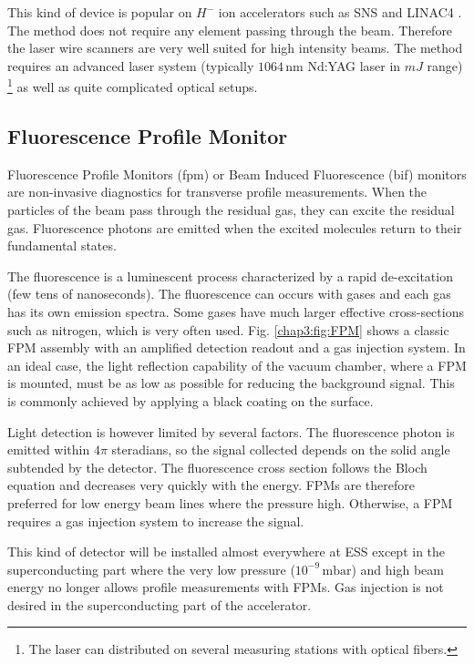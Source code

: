 \begin{refsection}
  This kind of device is popular on $H^-$ ion accelerators such as SNS \cite{LIU2010241} and LINAC4 \cite{Hofmann2015}. The method does not require any element passing through the beam. Therefore the laser wire scanners are very well suited for high intensity beams. The method requires an advanced laser system (typically $1064\,\mathrm{nm}$ Nd:YAG laser in $mJ$ range) \footnote{The laser can distributed on several measuring stations with optical fibers.} as well as quite complicated optical setups.

  \subsection{Fluorescence Profile Monitor}
  Fluorescence Profile Monitors (\acrshort{fpm}) or Beam Induced Fluorescence (\acrshort{bif}) monitors are non-invasive diagnostics for transverse profile measurements. When the particles of the beam pass through the residual gas, they can excite the residual gas. Fluorescence photons are emitted when the excited molecules return to their fundamental states.

  The fluorescence is a luminescent process characterized by a rapid de-excitation (few tens of nanoseconds). The fluorescence can occurs with gases and each gas has its own emission spectra. Some gases have much larger effective cross-sections such as nitrogen, which is very often used. Fig. \ref{chap3:fig:FPM} shows a classic FPM assembly with an amplified detection readout and a gas injection system. In an ideal case, the light reflection capability of the vacuum chamber, where a FPM is mounted, must be as low as possible for reducing the background signal. This is commonly achieved by applying a black coating on the surface.

  
  Light detection is however limited by several factors. The fluorescence photon is emitted within $4\pi$ steradians, so the signal collected depends on the solid angle subtended by the detector. The fluorescence cross section follows the Bloch equation and decreases very quickly with the energy. FPMs are therefore preferred for low energy beam lines where the pressure high. Otherwise, a FPM requires a gas injection system to increase the signal.

  This kind of detector will be installed almost everywhere at ESS \cite{Thomas2016} except in the superconducting part where the very low pressure ($10^{-9}\,\mathrm{mbar}$) and high beam energy no longer allows profile measurements with FPMs. Gas injection is not desired in the superconducting part of the accelerator.


\end{refsection}
